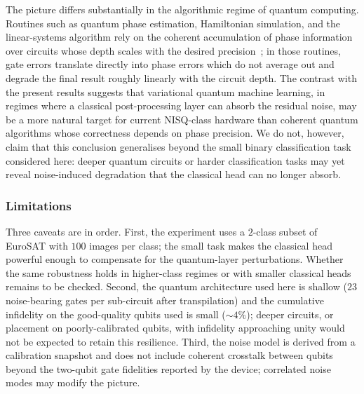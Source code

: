 The picture differs substantially in the algorithmic regime of quantum computing. Routines such as quantum phase estimation, Hamiltonian simulation, and the linear-systems algorithm rely on the coherent accumulation of phase information over circuits whose depth scales with the desired precision~\cite{NielsenChuang2011}; in those routines, gate errors translate directly into phase errors which do not average out and degrade the final result roughly linearly with the circuit depth. The contrast with the present results suggests that variational quantum machine learning, in regimes where a classical post-processing layer can absorb the residual noise, may be a more natural target for current NISQ-class hardware than coherent quantum algorithms whose correctness depends on phase precision. We do not, however, claim that this conclusion generalises beyond the small binary classification task considered here: deeper quantum circuits or harder classification tasks may yet reveal noise-induced degradation that the classical head can no longer absorb.

\subsubsection{Limitations}
\label{subsec:noise_limitations}

Three caveats are in order. First, the experiment uses a $2$-class subset of EuroSAT with $100$ images per class; the small task makes the classical head powerful enough to compensate for the quantum-layer perturbations. Whether the same robustness holds in higher-class regimes or with smaller classical heads remains to be checked. Second, the quantum architecture used here is shallow ($23$ noise-bearing gates per sub-circuit after transpilation) and the cumulative infidelity on the good-quality qubits used is small ($\sim 4\%$); deeper circuits, or placement on poorly-calibrated qubits, with infidelity approaching unity would not be expected to retain this resilience. Third, the noise model is derived from a calibration snapshot and does not include coherent crosstalk between qubits beyond the two-qubit gate fidelities reported by the device; correlated noise modes may modify the picture.



